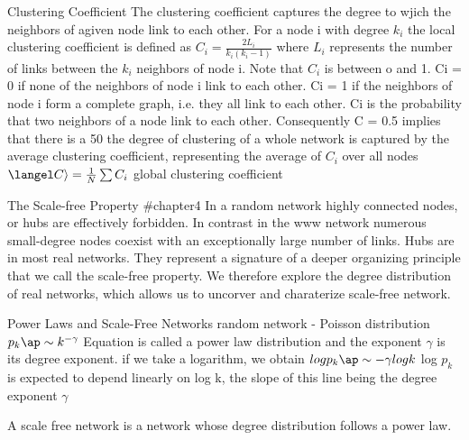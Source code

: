 Clustering Coefficient 
    The clustering coefficient captures the degree to wjich the neighbors of agiven node link to each other. For a node i with degree $k_{i}$ the local clustering coefficient is defined as
    $C_i= \frac{2L_{i}}{k_{i}(k_{i}-1)}$
    where $L_{i}$ represents the number of links between the $k_{i}$ neighbors of node i. Note that $C_{i}$ is between o and 1. 
        Ci = 0 if none of the neighbors of node i link to each other.
        Ci = 1 if the neighbors of node i form a complete graph, i.e. they all link to each other.
        Ci is the probability that two neighbors of a node link to each other. Consequently C = 0.5 implies that there is a 50%
    the degree of clustering of a whole network is captured by the average clustering coefficient, representing the average of $C_{i}$ over all nodes
        $\langel C \rangle = \frac{1}{N} \sum C_{i}$
global clustering coefficient 

The Scale-free Property #chapter4
In a random network highly connected nodes, or hubs are effectively forbidden. In contrast in the www network numerous small-degree nodes coexist with an exceptionally large number of links. Hubs are in most real networks. They represent a signature of a deeper organizing principle that we call the scale-free property. We therefore explore the degree distribution of real networks, which allows us to uncorver and charaterize scale-free network. 

Power Laws and Scale-Free Networks
    random network - Poisson distribution 
$p_{k} \ap \sim k^{-\gamma}$
    Equation is called a power law distribution and the exponent $\gamma$ is its degree exponent. if we take a logarithm, we obtain $log p_{k} \ap \sim {-\gamma}log k$
    log $p_{k}$ is expected to depend linearly on log k, the slope of this line being the degree exponent $\gamma$
    
A scale free network is a network whose degree distribution follows a power law.
